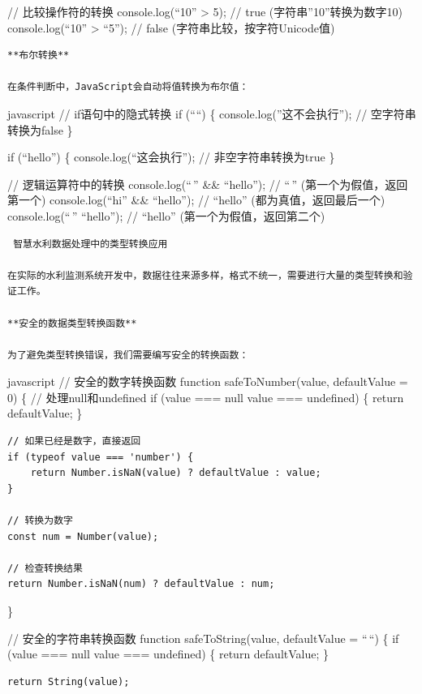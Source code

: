 // 比较操作符的转换 console.log(``10'' \textgreater{} 5); // true (字符串''10''转换为数字10) console.log(``10'' \textgreater{} ``5''); // false (字符串比较，按字符Unicode值)

\begin{lstlisting}
**布尔转换**

在条件判断中，JavaScript会自动将值转换为布尔值：
\end{lstlisting}

javascript // if语句中的隐式转换 if (````) \{ console.log(''这不会执行''); // 空字符串转换为false \}

if (``hello'') \{ console.log(``这会执行''); // 非空字符串转换为true \}

// 逻辑运算符中的转换 console.log(``\,'' \&\& ``hello''); // ``\,'' (第一个为假值，返回第一个) console.log(``hi'' \&\& ``hello''); // ``hello'' (都为真值，返回最后一个) console.log(``\,'' \textbar\textbar{} ``hello''); // ``hello'' (第一个为假值，返回第二个)

\begin{lstlisting}
 智慧水利数据处理中的类型转换应用

在实际的水利监测系统开发中，数据往往来源多样，格式不统一，需要进行大量的类型转换和验证工作。

**安全的数据类型转换函数**

为了避免类型转换错误，我们需要编写安全的转换函数：
\end{lstlisting}

javascript // 安全的数字转换函数 function safeToNumber(value, defaultValue = 0) \{ // 处理null和undefined if (value === null \textbar\textbar{} value === undefined) \{ return defaultValue; \}

\begin{verbatim}
// 如果已经是数字，直接返回
if (typeof value === 'number') {
    return Number.isNaN(value) ? defaultValue : value;
}

// 转换为数字
const num = Number(value);

// 检查转换结果
return Number.isNaN(num) ? defaultValue : num;
\end{verbatim}

\}

// 安全的字符串转换函数 function safeToString(value, defaultValue = ``\,``) \{ if (value === null \textbar\textbar{} value === undefined) \{ return defaultValue; \}

\begin{verbatim}
return String(value);
\end{verbatim}

